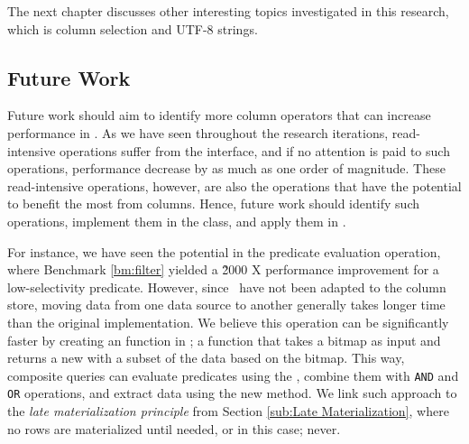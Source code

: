The next chapter discusses other interesting topics investigated in this research, which is column selection and UTF-8 strings. 

\subsection{Future Work}
\label{operations:future-work}
Future work should aim to identify more column operators that can increase performance in \gap. As we have seen throughout the research iterations, read-intensive operations suffer from the  interface, and if no attention is paid to such operations, performance decrease by as much as one order of magnitude. These read-intensive operations, however, are also the operations that have the potential to benefit the most from columns. Hence, future work should identify such operations, implement them in the  class, and apply them in \gap. 

For instance, we have seen the potential in the predicate evaluation operation, where Benchmark \ref{bm:filter} yielded a \~2000 X performance improvement for a low-selectivity predicate. However, since \gap~have not been adapted to the column store, moving data from one data source to another generally takes longer time than the original implementation. We believe this operation can be significantly faster by creating an  function in ; a function that takes a bitmap as input and returns a new  with a subset of the data based on the bitmap. This way, composite queries can evaluate predicates using the , combine them with \texttt{AND} and \texttt{OR} operations, and extract data using the new  method. We link such approach to the \textit{late materialization principle} from Section \ref{sub:Late Materialization}, where no rows are materialized until needed, or in this case; never.


